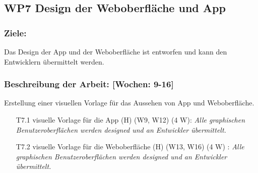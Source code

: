 \documentclass{scrreprt}
\begin{document}
\subsection*{WP7 Design der Weboberfläche und App}

\subsubsection{Ziele:} Das Design der App und der Weboberfläche ist entworfen und kann den Entwicklern übermittelt werden.
\subsubsection{Beschreibung der Arbeit: [Wochen: 9-16]} Erstellung einer visuellen Vorlage für das Aussehen von App und Weboberfläche. 

\begin{enumerate}
\item [T7.1] visuelle Vorlage für die App (H) (W9, W12) (4 W): \emph{ Alle graphischen Benutzeroberflächen werden designed und an Entwickler übermittelt.}
\item [T7.2] visuelle Vorlage für die Weboberfläche (H) (W13, W16) (4 W) : \emph{ Alle graphischen Benutzeroberflächen werden designed und an Entwickler übermittelt.}
\end{enumerate}
\end{document}

